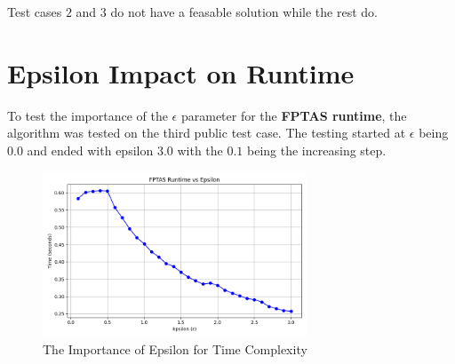 \documentclass[11pt]{article}
\begin{document}
Test cases $2$ and $3$ do not have a feasable solution while the rest do.

\section{Epsilon Impact on Runtime}

To test the importance of the $\epsilon$ parameter for the \textbf{FPTAS runtime}, the algorithm was tested on the third public test case. The testing started at $\epsilon$ being $0.0$ and ended with epsilon $3.0$ with the $0.1$ being the increasing step.

\begin{figure}[h!]
    \centering
    \includegraphics[width=0.7\textwidth]{plot.png} 
    \caption{The Importance of Epsilon for Time Complexity}
    \label{fig:epsilon_vs_time}
\end{figure}
\end{document}
